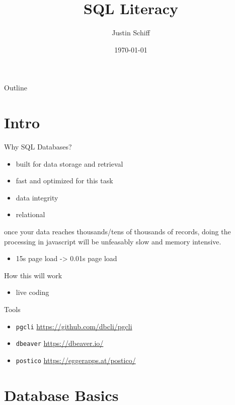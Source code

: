 \documentclass[presentation]{beamer}
\author{Justin Schiff}
\date{\today}
\title{SQL Literacy}
\begin{document}
\maketitle
\begin{frame}{Outline}
\tableofcontents
\end{frame}


\section{Intro}
\label{sec:org88fc326}

\begin{frame}[label={sec:orgc8bb363}]{Why SQL Databases?}
\begin{itemize}
\item built for data storage and retrieval
\item fast and optimized for this task
\item data integrity
\item relational
\end{itemize}

once your data reaches thousands/tens of thousands of records, doing
the processing in javascript will be unfeasably slow and memory
intensive.

\begin{itemize}
\item 15s page load -> 0.01s page load
\end{itemize}
\end{frame}

\begin{frame}[label={sec:orgab050f4},fragile]{How this will work}
 \begin{itemize}
\item live coding
\end{itemize}

\begin{block}{Tools}
\begin{itemize}
\item \texttt{pgcli} \url{https://github.com/dbcli/pgcli}
\item \texttt{dbeaver} \url{https://dbeaver.io/}
\item \texttt{postico} \url{https://eggerapps.at/postico/}
\end{itemize}
\end{block}
\end{frame}


\section{Database Basics}
\label{sec:org09822ff}
\end{document}
